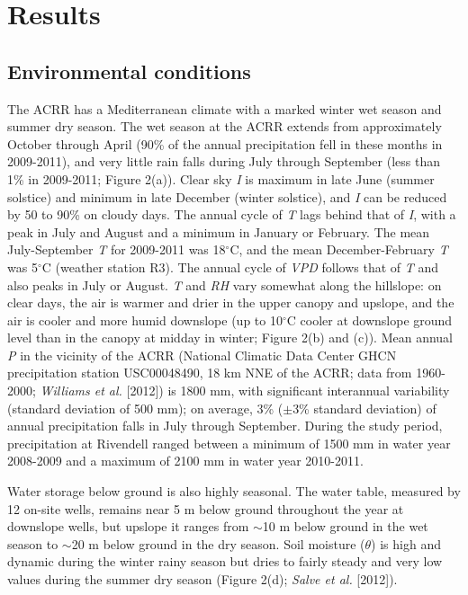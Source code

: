 \section{Results}

\subsection{Environmental conditions}
The ACRR has a Mediterranean climate with a marked winter wet season and summer dry season.  The wet season at the ACRR extends from approximately October through April (90\% of the annual precipitation fell in these months in 2009-2011), and very little rain falls during July through September (less than 1\% in 2009-2011; Figure 2(a)).  Clear sky \textit{I} is maximum in late June (summer solstice) and minimum in late December (winter solstice), and \textit{I} can be reduced by 50 to 90\% on cloudy days.  The annual cycle of \textit{T} lags behind that of \textit{I}, with a peak in July and August and a minimum in January or February. The mean July-September \textit{T} for 2009-2011 was 18$^{\circ}$C, and the mean December-February \textit{T} was 5$^{\circ}$C (weather station R3).  The annual cycle of \textit{VPD} follows that of \textit{T} and also peaks in July or August.  \textit{T} and \textit{RH} vary somewhat along the hillslope: on clear days, the air is warmer and drier in the upper canopy and upslope, and the air is cooler and more humid downslope (up to 10$^{\circ}$C cooler at downslope ground level than in the canopy at midday in winter; Figure 2(b) and (c)).  Mean annual \textit{P} in the vicinity of the ACRR (National Climatic Data Center GHCN precipitation station USC00048490, 18 km NNE of the ACRR; data from 1960-2000; \textit{Williams et al.} [2012]) is 1800 mm, with significant interannual variability (standard deviation of 500 mm); on average, 3\% ($\pm$3\% standard deviation) of annual precipitation falls in July through September.  During the study period, precipitation at Rivendell ranged between a minimum of 1500 mm in water year 2008-2009 and a maximum of 2100 mm in water year 2010-2011.

Water storage below ground is also highly seasonal. The water table, measured by 12 on-site wells, remains near 5 m below ground throughout the year at downslope wells, but upslope it ranges from $\sim$10 m below ground in the wet season to $\sim$20 m below ground in the dry season.   Soil moisture ($\theta$) is high and dynamic during the winter rainy season but dries to fairly steady and very low values during the summer dry season (Figure 2(d); \textit{Salve et al.} [2012]).  

